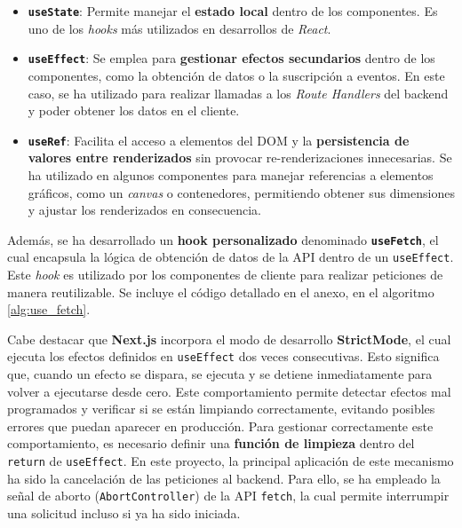 \begin{itemize}
    \item \textbf{\texttt{useState}}: Permite manejar el \textbf{estado local} dentro de los componentes. Es uno de los \textit{hooks} más utilizados en desarrollos de \textit{React}.

    \item \textbf{\texttt{useEffect}}: Se emplea para \textbf{gestionar efectos secundarios} dentro de los componentes, como la obtención de datos o la suscripción a eventos. En este caso, se ha utilizado para realizar llamadas a los \textit{Route Handlers} del backend y poder obtener los datos en el cliente.

    \item \textbf{\texttt{useRef}}: Facilita el acceso a elementos del DOM y la \textbf{persistencia de valores entre renderizados} sin provocar re-renderizaciones innecesarias. Se ha utilizado en algunos componentes para manejar referencias a elementos gráficos, como un \textit{canvas} o contenedores, permitiendo obtener sus dimensiones y ajustar los renderizados en consecuencia.
\end{itemize}

Además, se ha desarrollado un \textbf{hook personalizado} denominado \textbf{\texttt{useFetch}}, el cual encapsula la lógica de obtención de datos de la API dentro de un \texttt{useEffect}. Este \textit{hook} es utilizado por los componentes de cliente para realizar peticiones de manera reutilizable. Se incluye el código detallado en el anexo, en el algoritmo \ref{alg:use_fetch}.

Cabe destacar que \textbf{Next.js} incorpora el modo de desarrollo \textbf{StrictMode}, el cual ejecuta los efectos definidos en \texttt{useEffect} dos veces consecutivas. Esto significa que, cuando un efecto se dispara, se ejecuta y se detiene inmediatamente para volver a ejecutarse desde cero. Este comportamiento permite detectar efectos mal programados y verificar si se están limpiando correctamente, evitando posibles errores que puedan aparecer en producción. Para gestionar correctamente este comportamiento, es necesario definir una \textbf{función de limpieza} dentro del \texttt{return} de \texttt{useEffect}. En este proyecto, la principal aplicación de este mecanismo ha sido la cancelación de las peticiones al backend. Para ello, se ha empleado la señal de aborto (\texttt{AbortController}) de la API \texttt{fetch}, la cual permite interrumpir una solicitud incluso si ya ha sido iniciada.

